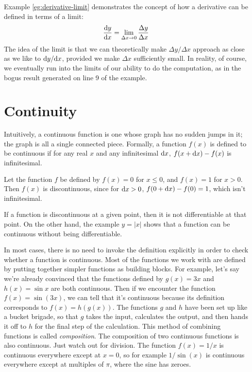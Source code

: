 Example \ref{eg:derivative-limit} demonstrates the concept of how a derivative can be
defined in terms of a limit:
\begin{equation*}
  \frac{\textup{d} y}{\textup{d} x} = \lim_{\Delta x\rightarrow 0} \frac{\Delta y}{\Delta x}
\end{equation*}
The idea of the limit is that we can theoretically make $\Delta y/\Delta x$ approach
as close as we like to $\textup{d} y/\textup{d} x$, provided we make $\Delta x$ sufficiently small.
In reality, of course, we eventually run into the limits of our ability to do the
computation, as in the bogus result generated on line 9 of the example.

\section{Continuity}

Intuitively, a continuous function is one whose graph
has no sudden jumps in it; the graph is all a single connected piece. Formally, a function $f(x)$ is defined to
be continuous if for any real $x$ and any infinitesimal $\textup{d} x$, $f(x+\textup{d} x)-f(x)$ is infinitesimal.\label{def-continuity}

\begin{eg}\label{eg:discontinuous}
Let the function $f$ be defined by $f(x)=0$ for $x\le 0$, and $f(x)=1$ for $x>0$. Then $f(x)$ is
discontinuous, since for $\textup{d} x>0$, $f(0+\textup{d} x)-f(0)=1$, which isn't infinitesimal.
\end{eg}


If a function is discontinuous at a given point, then it is not differentiable at that point.
On the other hand, the example $y=|x|$ shows that a function can be continuous without
being differentiable.

In most cases, there is no need to invoke the definition explicitly in order to check whether
a function is continuous. Most of the functions we work with are defined by putting together
simpler functions as building blocks. For example, let's say we're already convinced that the
functions defined by $g(x)=3x$ and $h(x)=\sin x$ are both continuous. Then if we encounter the
function $f(x)=\sin(3x)$, we can tell that it's continuous because its definition corresponds
to $f(x)=h(g(x))$. The functions $g$ and $h$ have been set up like a bucket brigade, so that
$g$ takes the input, calculates the output, and then hands it off to $h$ for the final step
of the calculation. This method of combining functions is called \emph{composition}.
The composition of two continuous functions is also continuous. Just watch out for division.
The function $f(x)=1/x$ is continuous everywhere except at $x=0$, so for example $1/\sin(x)$
is continuous everywhere except at multiples of $\pi$, where the sine has zeroes.

